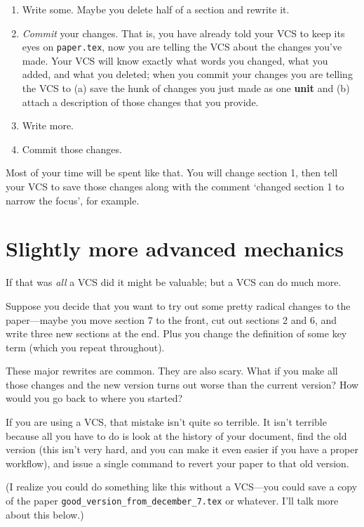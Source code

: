 \documentclass{article}
\begin{document}
\begin{enumerate}
\item
  Write some. Maybe you delete half of a section and rewrite it.
\item
  \emph{Commit} your changes. That is, you have already told your VCS 
  to keep its eyes on \verb!paper.tex!, now you are telling the VCS 
  about the changes you’ve made. Your VCS will know exactly what words 
  you changed, what you added, and what you deleted; when you commit 
  your changes you are telling the VCS to (a) save the hunk of changes 
  you just made as one \textbf{unit} and (b) attach a description of 
  those changes that you provide.
\item
  Write more.
\item
  Commit those changes.
\end{enumerate}
Most of your time will be spent like that. You will change section 1, 
then tell your VCS to save those changes along with the comment 
‘changed section 1 to narrow the focus’, for example.

\section{Slightly more advanced mechanics}

If that was \emph{all} a VCS did it might be valuable; but a VCS can 
do much more.

Suppose you decide that you want to try out some pretty radical 
changes to the paper—maybe you move section 7 to the front, cut out 
sections 2 and 6, and write three new sections at the end. Plus you 
change the definition of some key term (which you repeat throughout).

These major rewrites are common. They are also scary. What if you make 
all those changes and the new version turns out worse than the current 
version? How would you go back to where you started?

If you are using a VCS, that mistake isn’t quite so terrible. It isn’t 
terrible because all you have to do is look at the history of your 
document, find the old version (this isn’t very hard, and you can make 
it even easier if you have a proper workflow), and issue a single 
command to revert your paper to that old version.

(I realize you could do something like this without a VCS—you could 
save a copy of the paper \verb!good_version_from_december_7.tex! or 
whatever. I’ll talk more about this below.)
\end{document}
